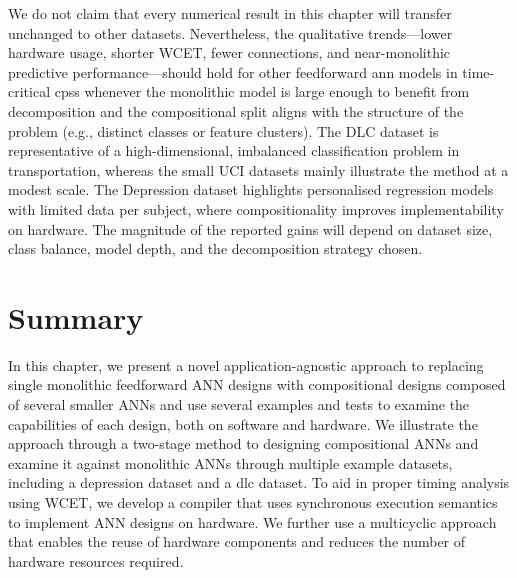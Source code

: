 We do not claim that every numerical result in this chapter will transfer unchanged to other datasets. Nevertheless, the qualitative trends---lower hardware usage, shorter WCET, fewer connections, and near-monolithic predictive performance---should hold for other feedforward \gls{ann} models in time-critical \glspl{cps} whenever the monolithic model is large enough to benefit from decomposition and the compositional split aligns with the structure of the problem (e.g., distinct classes or feature clusters). The DLC dataset is representative of a high-dimensional, imbalanced classification problem in transportation, whereas the small UCI datasets mainly illustrate the method at a modest scale. The Depression dataset highlights personalised regression models with limited data per subject, where compositionality improves implementability on hardware. The magnitude of the reported gains will depend on dataset size, class balance, model depth, and the decomposition strategy chosen.


\section{Summary}
\label{sec:chapter3_conclusions}
In this chapter, we present a novel application-agnostic approach to replacing single monolithic feedforward ANN designs with compositional designs composed of several smaller ANNs and use several examples and tests to examine the capabilities of each design, both on software and hardware. We illustrate the approach through a two-stage method to designing compositional ANNs and examine it against monolithic ANNs through multiple example datasets, including a depression dataset and a \gls{dlc} dataset. To aid in proper timing analysis using WCET, we develop a compiler that uses synchronous execution semantics to implement ANN designs on hardware. We further use a multicyclic approach that enables the reuse of hardware components and reduces the number of hardware resources required.

